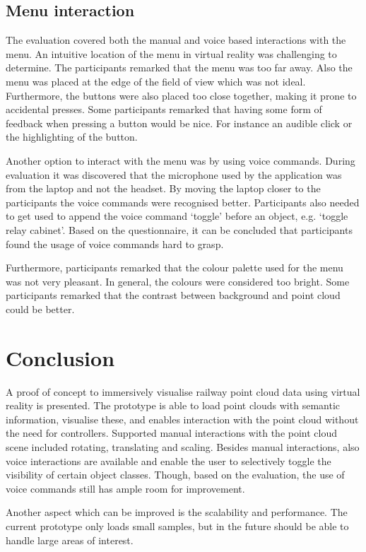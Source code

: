 \subsection{Menu interaction}
The evaluation covered both the manual and voice based interactions with the menu. An intuitive location of the menu in virtual reality was challenging to determine. The participants remarked that the menu was too far away. Also the menu was placed at the edge of the field of view which was not ideal. Furthermore, the buttons were also placed too close together, making it prone to accidental presses. Some participants remarked that having some form of feedback when pressing a button would be nice. For instance an audible click or the highlighting of the button.

Another option to interact with the menu was by using voice commands. During evaluation it was discovered that the microphone used by the application was from the laptop and not the headset. By moving the laptop closer to the participants the voice commands were recognised better. Participants also needed to get used to append the voice command `toggle' before an object, e.g. `toggle relay cabinet'. Based on the questionnaire, it can be concluded that participants found the usage of voice commands hard to grasp.

Furthermore, participants remarked that the colour palette used for the menu was not very pleasant. In general, the colours were considered too bright. Some participants remarked that the contrast between background and point cloud could be better.

\section{Conclusion}
A proof of concept to immersively visualise railway point cloud data using virtual reality is presented. The prototype is able to load point clouds with semantic information, visualise these, and enables interaction with the point cloud without the need for controllers. Supported manual interactions with the point cloud scene included rotating, translating and scaling. Besides manual interactions, also voice interactions are available and enable the user to selectively toggle the visibility of certain object classes. Though, based on the evaluation, the use of voice commands still has ample room for improvement.

Another aspect which can be improved is the scalability and performance. The current prototype only loads small samples, but in the future should be able to handle large areas of interest.


